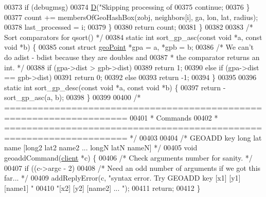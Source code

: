 \begin{DoxyCode}
{{{{{{{{00373             \textcolor{keywordflow}{if} (debugmsg)
00374                 \hyperlink{debugmacro_8h_a74021f021dcdfbb22891787b79c5529d}{D}(\textcolor{stringliteral}{"Skipping processing of %
00375             \textcolor{keywordflow}{continue};
00376         \}
00377         count += membersOfGeoHashBox(zobj, neighbors[i], ga, lon, lat, radius);
00378         last\_processed = i;
00379     \}
00380     \textcolor{keywordflow}{return} count;
00381 \}
00382 
00383 \textcolor{comment}{/* Sort comparators for qsort() */}
00384 \textcolor{keyword}{static} \textcolor{keywordtype}{int} sort\_gp\_asc(\textcolor{keyword}{const} \textcolor{keywordtype}{void} *a, \textcolor{keyword}{const} \textcolor{keywordtype}{void} *b) \{
00385     \textcolor{keyword}{const} \textcolor{keyword}{struct} \hyperlink{structgeoPoint}{geoPoint} *gpa = a, *gpb = b;
00386     \textcolor{comment}{/* We can't do adist - bdist because they are doubles and}
00387 \textcolor{comment}{     * the comparator returns an int. */}
00388     \textcolor{keywordflow}{if} (gpa->dist > gpb->dist)
00389         \textcolor{keywordflow}{return} 1;
00390     \textcolor{keywordflow}{else} \textcolor{keywordflow}{if} (gpa->dist == gpb->dist)
00391         \textcolor{keywordflow}{return} 0;
00392     \textcolor{keywordflow}{else}
00393         \textcolor{keywordflow}{return} -1;
00394 \}
00395 
00396 \textcolor{keyword}{static} \textcolor{keywordtype}{int} sort\_gp\_desc(\textcolor{keyword}{const} \textcolor{keywordtype}{void} *a, \textcolor{keyword}{const} \textcolor{keywordtype}{void} *b) \{
00397     \textcolor{keywordflow}{return} -sort\_gp\_asc(a, b);
00398 \}
00399 
00400 \textcolor{comment}{/* ====================================================================}
00401 \textcolor{comment}{ * Commands}
00402 \textcolor{comment}{ * ==================================================================== */}
00403 
00404 \textcolor{comment}{/* GEOADD key long lat name [long2 lat2 name2 ... longN latN nameN] */}
00405 \textcolor{keywordtype}{void} geoaddCommand(\hyperlink{structclient}{client} *c) \{
00406     \textcolor{comment}{/* Check arguments number for sanity. */}
00407     \textcolor{keywordflow}{if} ((c->argc - 2) %
00408         \textcolor{comment}{/* Need an odd number of arguments if we got this far... */}
00409         addReplyError(c, \textcolor{stringliteral}{"syntax error. Try GEOADD key [x1] [y1] [name1] "}
00410                          \textcolor{stringliteral}{"[x2] [y2] [name2] ... "});
00411         \textcolor{keywordflow}{return};
00412     \}
}}}}}}}}}
\end{DoxyCode}
